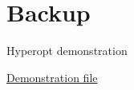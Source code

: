 
\appendix

\section{Backup}

\begin{frame}[t]{Hyperopt demonstration}

  \href{https://github.com/RoyStegeman/overfitting_nnpdf/blob/main/Hyperoptim\%20eb553.md}{Demonstration file}

\end{frame}
